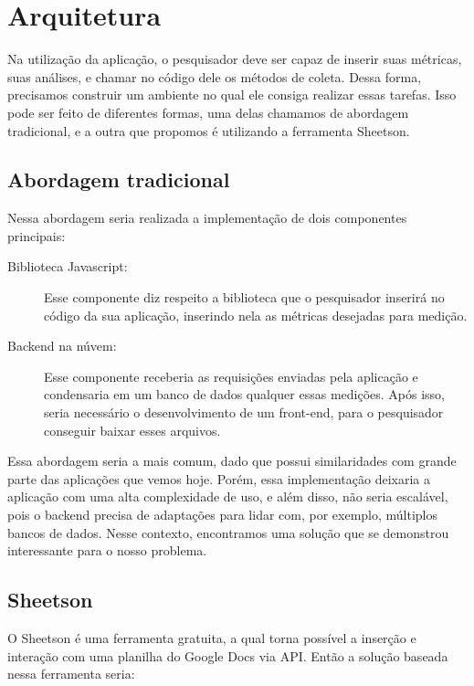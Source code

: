 \documentclass[12pt]{tcc}
\begin{document}
\section{Arquitetura}

Na utilização da aplicação, o pesquisador deve ser capaz de inserir suas métricas, suas análises, e chamar no código dele os métodos de coleta. Dessa forma, precisamos construir um ambiente no qual ele consiga realizar essas tarefas. Isso pode ser feito de diferentes formas, uma delas chamamos de abordagem tradicional, e a outra que propomos é utilizando a ferramenta Sheetson.

\subsection{Abordagem tradicional}

Nessa abordagem seria realizada a implementação de dois componentes principais: 

\begin{description}
	\item[Biblioteca Javascript:] Esse componente diz respeito a biblioteca que o pesquisador inserirá no código da sua aplicação, inserindo nela as métricas desejadas para medição.

	\item[Backend na núvem:] Esse componente receberia as requisições enviadas pela aplicação e condensaria em um banco de dados qualquer essas medições. Após isso, seria necessário o desenvolvimento de um front-end, para o pesquisador conseguir baixar esses arquivos.
\end{description}

Essa abordagem seria a mais comum, dado que possui similaridades com grande parte das aplicações que vemos hoje. Porém, essa implementação deixaria a aplicação com uma alta complexidade de uso, e além disso, não seria escalável, pois o backend precisa de adaptações para lidar com, por exemplo, múltiplos bancos de dados.
Nesse contexto, encontramos uma solução que se demonstrou interessante para o nosso problema.

\subsection{Sheetson}

O Sheetson é uma ferramenta gratuita, a qual torna possível a inserção e interação com uma planilha do Google Docs via API. Então a solução baseada nessa ferramenta seria:
\end{document}
